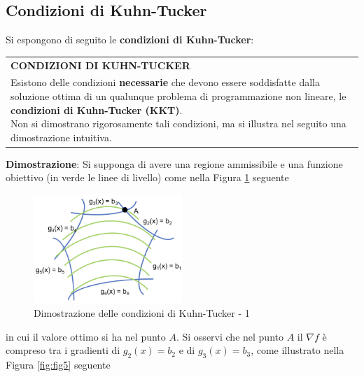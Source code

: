 \documentclass[a4paper]{extarticle}
\renewcommand\arraystretch{}
\begin{document}
\vspace{1em}
\subsection{Condizioni di Kuhn-Tucker}
Si espongono di seguito le \textbf{condizioni di Kuhn-Tucker}:

\vspace{1em}
\setlength{\tabcolsep}{14pt}
\renewcommand{\arraystretch}{2}
\noindent
\begin{tabularx}{\textwidth}{@{}|P|@{}}
    \hline
    {\textbf{CONDIZIONI DI KUHN-TUCKER}}\\
    \parbox{\linewidth}{Esistono delle condizioni \textbf{necessarie} che devono essere soddisfatte dalla soluzione ottima di un qualunque problema di programmazione non lineare, le \textbf{condizioni di Kuhn-Tucker (KKT)}.\\
    Non si dimostrano rigorosamente tali condizioni, ma si illustra nel seguito una dimostrazione intuitiva. \vspace{3mm}}\\
    \hline
\end{tabularx}

\vspace{2em}
\noindent
\textbf{Dimostrazione}: Si supponga di avere una regione ammissibile e una funzione obiettivo (in verde le linee di livello) come nella Figura \ref{fig:fig4} seguente

\begin{figure}[H]
    \centering
    \includegraphics[width=0.5\textwidth]{dimostrazione-khun-tucker-1.png}
    \caption{Dimostrazione delle condizioni di Kuhn-Tucker - 1}
    \label{fig:fig4}
\end{figure}

\vspace{1em}
\noindent
in cui il valore ottimo si ha nel punto $A$. Si osservi che nel punto $A$ il $\nabla f$ è compreso tra i gradienti di $g_2(x) = b_2$ e di $g_3(x) = b_3$, come illustrato nella Figura \ref{fig:fig5} seguente
\end{document}
